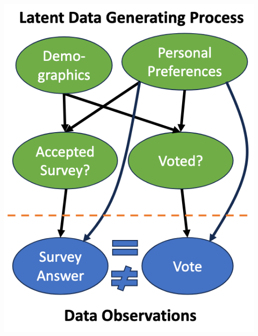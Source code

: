 \documentclass[11pt]{article}
\theoremstyle{definition}
\begin{document}
\includegraphics[scale = 0.25]{14.png}
\end{document}
